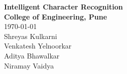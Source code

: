 \documentclass[main.tex]{subfiles}
\begin{document}
\begin{titlepage}
\vspace*{20em}
\begin{center}
	\LARGE{\bf{Intelligent Character Recognition\\}}
	\horrule{0.4pt}
	\vspace{5mm}
	\Large{\textbf{College of Engineering, Pune\\}}
	\today{} \\
	\vspace{10mm}
	\hspace{26mm}Shreyas Kulkarni \\
	\hspace{26mm}Venkatesh Yelnoorkar \\
	\hspace{26mm}Aditya Bhawalkar \\
	\hspace{26mm}Niramay Vaidya \\
\end{center}
\end{titlepage}
\end{document}
